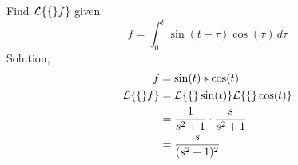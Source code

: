 \documentclass[diffeq.tex]{subfiles}
\begin{document}
    \begin{example}
        Find $\mathcal{L}\{\{\}f\}$ given
        \begin{equation}
            f = \int_{0}^{t}\sin(t-\tau)\cos(\tau)\,d\tau
        \end{equation}
        Solution,
        \begin{alignat}{1}
            f &= \sin(t) * \cos(t)\\
            \mathcal{L}\{\{\}f\} &= \mathcal{L}\{\{\}\sin(t)\}\mathcal{L}\{\{\}\cos(t)\}\\
            &= \frac{1}{s^{2} + 1}\cdot\frac{s}{s^{2} + 1}\\
            &= \frac{s}{(s^{2} + 1)^{2}}
        \end{alignat}
    \end{example}
\end{document}
